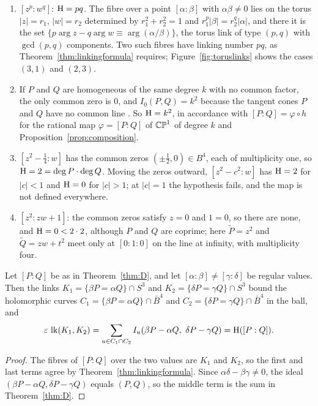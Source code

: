 \begin{example}\label{ex:holoexamples}
\begin{enumerate}[label=\textup{(\alph*)}]
\item $[z^p:w^q]$: $\mathrm{H}=pq$. The fibre over a point $[\alpha:\beta]$ with $\alpha\beta\neq0$ lies on the torus $|z|=r_1$, $|w|=r_2$ determined by $r_1^2+r_2^2=1$ and $r_1^p|\beta|=r_2^q|\alpha|$, and there it is the set $\{p\arg z-q\arg w\equiv\arg(\alpha/\beta)\}$, the torus link of type $(p,q)$ with $\gcd(p,q)$ components. Two such fibres have linking number $pq$, as Theorem~\ref{thm:linkingformula} requires; Figure~\ref{fig:toruslinks} shows the cases $(3,1)$ and $(2,3)$.
\item If $P$ and $Q$ are homogeneous of the same degree $k$ with no common factor, the only common zero is $0$, and $I_0(P,Q)=k^2$ because the tangent cones $P$ and $Q$ have no common line \cite[Section~3.3]{Ful69}. So $\mathrm{H}=k^2$, in accordance with $[P:Q]=\varphi\circ h$ for the rational map $\varphi=[P:Q]$ of $\mathbb{CP}^1$ of degree $k$ and Proposition~\ref{prop:composition}.
\item $[z^2-\tfrac14:w]$ has the common zeros $(\pm\tfrac12,0)\in B^4$, each of multiplicity one, so $\mathrm{H}=2=\deg P\cdot\deg Q$. Moving the zeros outward, $[z^2-c^2:w]$ has $\mathrm{H}=2$ for $|c|<1$ and $\mathrm{H}=0$ for $|c|>1$; at $|c|=1$ the hypothesis fails, and the map is not defined everywhere.
\item $[z^2:zw+1]$: the common zeros satisfy $z=0$ and $1=0$, so there are none, and $\mathrm{H}=0<2\cdot2$, although $P$ and $Q$ are coprime; here $\tilde P=z^2$ and $\tilde Q=zw+t^2$ meet only at $[0:1:0]$ on the line at infinity, with multiplicity four.
\end{enumerate}
\end{example}

\begin{corollary}\label{cor:lkint}
Let $[P:Q]$ be as in Theorem~\ref{thm:D}, and let $[\alpha:\beta]\neq[\gamma:\delta]$ be regular values. Then the links $K_1=\{\beta P=\alpha Q\}\cap S^3$ and $K_2=\{\delta P=\gamma Q\}\cap S^3$ bound the holomorphic curves $C_1=\{\beta P=\alpha Q\}\cap\bar B^4$ and $C_2=\{\delta P=\gamma Q\}\cap\bar B^4$ in the ball, and
\[
\varepsilon\,\operatorname{lk}(K_1,K_2)=\sum_{u\in C_1\cap C_2}I_u(\beta P-\alpha Q,\ \delta P-\gamma Q)=\mathrm{H}([P:Q]).
\]
\end{corollary}

\begin{proof}
The fibres of $[P:Q]$ over the two values are $K_1$ and $K_2$, so the first and last terms agree by Theorem~\ref{thm:linkingformula}. Since $\alpha\delta-\beta\gamma\neq0$, the ideal $(\beta P-\alpha Q,\delta P-\gamma Q)$ equals $(P,Q)$, so the middle term is the sum in Theorem~\ref{thm:D}.
\end{proof}

